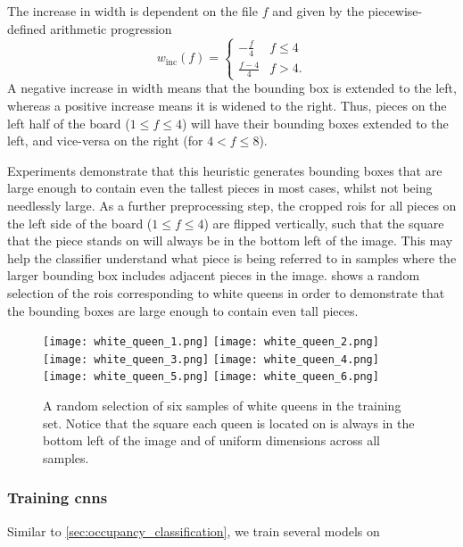 \documentclass[../main.tex]{subfiles}
\begin{document}
The increase in width is dependent on the file $f$ and given by the piecewise-defined arithmetic progression
\begin{equation*}
    w_\text{inc}(f) = \begin{cases}
        -\frac{f}{4} & f \leq 4 \\
        \frac{f-4}{4} & f > 4.
    \end{cases}
\end{equation*}
A negative increase in width means that the bounding box is extended to the left, whereas a positive increase means it is widened to the right.
Thus, pieces on the left half of the board ($1 \leq f \leq 4$) will have their bounding boxes extended to the left, and vice-versa on the right (for $4 < f \leq 8$).

Experiments demonstrate that this heuristic generates bounding boxes that are large enough to contain even the tallest pieces in most cases, whilst not being needlessly large.
As a further preprocessing step, the cropped \glspl{roi} for all pieces on the left side of the board ($1 \leq f \leq 4$) are flipped vertically, such that the square that the piece stands on will always be in the bottom left of the image.
This may help the classifier understand what piece is being referred to in samples where the larger bounding box includes adjacent pieces in the image.
 shows a random selection of the \glspl{roi} corresponding to white queens in order to demonstrate that the bounding boxes are large enough to contain even tall pieces.
\begin{figure}
    \centering
    \texttt{[image: white\_queen\_1.png]}
    \texttt{[image: white\_queen\_2.png]}
    \texttt{[image: white\_queen\_3.png]}
    \texttt{[image: white\_queen\_4.png]}
    \texttt{[image: white\_queen\_5.png]}
    \texttt{[image: white\_queen\_6.png]}
    \caption[A random selection of six samples of white queens in the training set.]{A random selection of six samples of white queens in the training set. Notice that the square each queen is located on is always in the bottom left of the image and of uniform dimensions across all samples.}
    \label{fig:white_queens}
\end{figure}

\subsubsection{Training \glspl{cnn}}
Similar to \cref{sec:occupancy_classification}, we train several models on 
\end{document}
